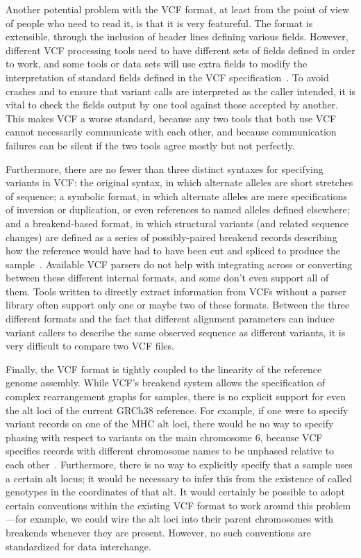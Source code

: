 Another potential problem with the VCF format, at least from the point of view of people who need to read it, is that it is very featureful. The format is extensible, through the inclusion of header lines defining various fields. However, different VCF processing tools need to have different sets of fields defined in order to work, and some tools or data sets \cite{sudmant2015integrated} will use extra fields to modify the interpretation of standard fields defined in the VCF specification~\cite{marshall2013variant}. To avoid crashes and to ensure that variant calls are interpreted as the caller intended, it is vital to check the fields output by one tool against those accepted by another. This makes VCF a worse standard, because any two tools that both use VCF cannot necessarily communicate with each other, and because communication failures can be silent if the two tools agree mostly but not perfectly.

Furthermore, there are no fewer than three distinct syntaxes for specifying variants in VCF: the original syntax, in which alternate alleles are short stretches of sequence; a symbolic format, in which alternate alleles are mere specifications of inversion or duplication, or even references to named alleles defined elsewhere; and a breakend-based format, in which structural variants (and related sequence changes) are defined as a series of possibly-paired breakend records describing how the reference would have had to have been cut and spliced to produce the sample~\cite{marshall2013variant}. Available VCF parsers do not help with integrating across or converting between these different internal formats, and some don't even support all of them. Tools written to directly extract information from VCFs without a parser library often support only one or maybe two of these formats. Between the three different formats and the fact that different alignment parameters can induce variant callers to describe the same observed sequence as different variants, it is very difficult to compare two VCF files.

Finally, the VCF format is tightly coupled to the linearity of the reference genome assembly. While VCF's breakend system allows the specification of complex rearrangement graphs for samples, there is no explicit support for even the alt loci of the current GRCh38 reference. For example, if one were to specify variant records on one of the MHC alt loci, there would be no way to specify phasing with respect to variants on the main chromosome 6, because VCF specifies records with different chromosome names to be unphased relative to each other~\cite{marshall2013variant}. Furthermore, there is no way to explicitly specify that a sample uses a certain alt locus; it would be necessary to infer this from the existence of called genotypes in the coordinates of that alt. It would certainly be possible to adopt certain conventions within the existing VCF format to work around this problem---for example, we could wire the alt loci into their parent chromosomes with breakends whenever they are present. However, no such conventions are standardized for data interchange.

